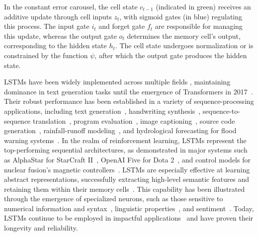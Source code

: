 In the constant error carousel, the cell state $c_{t-1}$ (indicated in green) receives an additive update through cell inputs $z_t$, with sigmoid gates (in blue) regulating this process. The input gate $i_t$ and forget gate $f_t$ are responsible for managing this update, whereas the output gate $o_t$ determines the memory cell’s output, corresponding to the hidden state $h_t$. The cell state undergoes normalization or is constrained by the function $\psi$, after which the output gate produces the hidden state.

LSTMs have been widely implemented across multiple fields \citep{Hochreiter:01,Hochreiter:07,Schmidhuber:15}, maintaining dominance in text generation tasks until the emergence of Transformers in 2017~\citep{Vaswani:17}. Their robust performance has been established in a variety of sequence-processing applications, including text generation~\citep{Graves:13,Karpathy:15blog}, handwriting synthesis~\citep{Graves:13}, sequence-to-sequence translation~\citep{Sutskever:14nips}, program evaluation~\citep{Zaremba:14arxiv}, image captioning~\citep{Karpathy:15,Hossain:19}, source code generation~\citep{Karpathy:15blog}, rainfall-runoff modeling~\citep{Kratzert:18,Kratzert:19}, and hydrological forecasting for flood warning systems~\citep{Nearing:24}. In the realm of reinforcement learning, LSTMs represent the top-performing sequential architectures, as demonstrated in major systems such as AlphaStar for StarCraft II~\citep{Vinyals:17short}, OpenAI Five for Dota 2~\citep{OpenAI:19}, and control models for nuclear fusion’s magnetic controllers~\citep{Degrave:22short}. LSTMs are especially effective at learning abstract representations, successfully extracting high-level semantic features and retaining them within their memory cells~\citep{Karpathy:15blog}. This capability has been illustrated through the emergence of specialized neurons, such as those sensitive to numerical information and syntax~\citep{Lakretz:19}, linguistic properties~\citep{Bau:19}, and sentiment~\citep{Radford:17arxiv}. Today, LSTMs continue to be employed in impactful applications~\citep{Degrave:22short,Nearing:24} and have proven their longevity and reliability.

